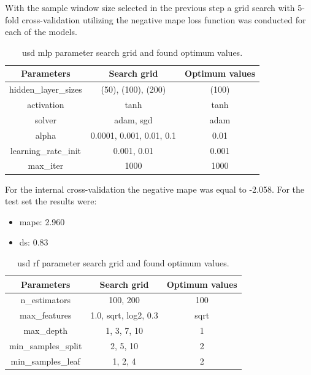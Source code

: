 With the sample window size selected in the previous step a grid search with 5-fold cross-validation utilizing the negative \gls{mape} loss function was conducted for each of the models.

\begin{table}[H]
    \centering
    \begin{tabular}{|c|c|c|}
        \hline
        Parameters & Search grid & Optimum values \\
        \hline
        \hline
        hidden\_layer\_sizes & (50), (100), (200) & (100) \\
        \hline
        activation & tanh & tanh \\
        \hline
        solver & adam, sgd & adam \\
        \hline
        alpha & 0.0001, 0.001, 0.01, 0.1 & 0.01 \\
        \hline
        learning\_rate\_init & 0.001, 0.01 & 0.001 \\
        \hline
        max\_iter & 1000 & 1000 \\
        \hline
    \end{tabular}
    \caption{\gls{usd} \gls{mlp} parameter search grid and found optimum values.}
\end{table}

For the internal cross-validation the negative \gls{mape} was equal to -2.058. For the test set the results were:
\begin{itemize}
    \item \Gls{mape}: 2.960
    \item \Gls{ds}: 0.83
\end{itemize}

\begin{table}[H]
    \centering
    \begin{tabular}{|c|c|c|}
        \hline
        Parameters & Search grid & Optimum values \\
        \hline
        \hline
        n\_estimators & 100, 200 & 100 \\
        \hline
        max\_features & 1.0, sqrt, log2, 0.3 & sqrt \\
        \hline
        max\_depth & 1, 3, 7, 10 & 1 \\
        \hline
        min\_samples\_split & 2, 5, 10 & 2 \\
        \hline
        min\_samples\_leaf & 1, 2, 4 & 2 \\
        \hline
    \end{tabular}
    \caption{\gls{usd} \gls{rf} parameter search grid and found optimum values.}
\end{table}

